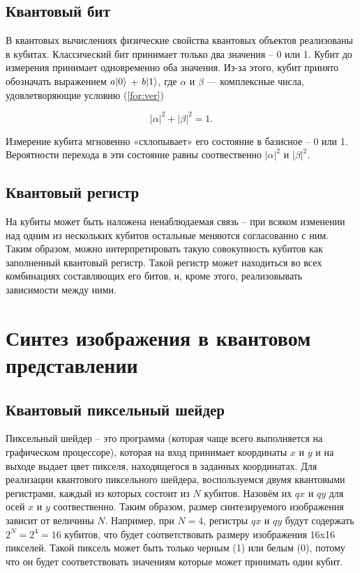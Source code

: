 \subsection{Квантовый бит}

В квантовых вычислениях физические свойства квантовых объектов реализованы в кубитах. Классический бит принимает только два значения – 0 или 1. Кубит до измерения принимает одновременно оба значения. Из-за этого, кубит принято обозначать выражением $a\lvert0\rangle$ + $b\lvert1\rangle$, где $\alpha$ и $\beta$ — комплексные числа, удовлетворяющие условию (\ref{for:ver})

\begin{equation}
\label{for:ver}
|\alpha|^2 + |\beta|^2 = 1. 
\end{equation} 

Измерение кубита мгновенно «схлопывает»  его состояние в базисное – 0 или 1. Вероятности перехода в эти состояние равны соотвественно $|\alpha|^2$ и $|\beta|^2$. 

\subsection{Квантовый регистр}

На кубиты может быть наложена ненаблюдаемая связь -- при всяком изменении над одним из нескольких кубитов остальные меняются согласованно с ним. Таким образом, можно интерпретировать такую совокупность кубитов как заполненный квантовый регистр. Такой регистр может находиться во всех комбинациях составляющих его битов, и, кроме этого, реализовывать зависимости между ними.


\section{Синтез изображения в квантовом представлении}

\subsection{Квантовый пиксельный шейдер}

Пиксельный шейдер -- это программа (которая чаще всего выполняется на графическом процессоре), которая на вход принимает координаты $x$ и $y$ и на выходе выдает цвет пикселя, находящегося в заданных координатах. Для реализации квантового пиксельного шейдера, воспользуемся двумя квантовыми регистрами, каждый из которых состоит из $N$ кубитов. Назовём их $qx$ и $qy$ для осей $x$ и $y$ соотвественно. Таким образом, размер синтезируемого изображения зависит от величины $N$. Например, при $N = 4$, регистры $qx$ и $qy$ будут содержать $2^N = 2^4 = 16$ кубитов, что будет соответствовать размеру изображения 16x16 пикселей. Такой пиксель может быть только черным (1) или белым (0), потому что он будет соответствовать значениям которые может принимать один кубит. 

